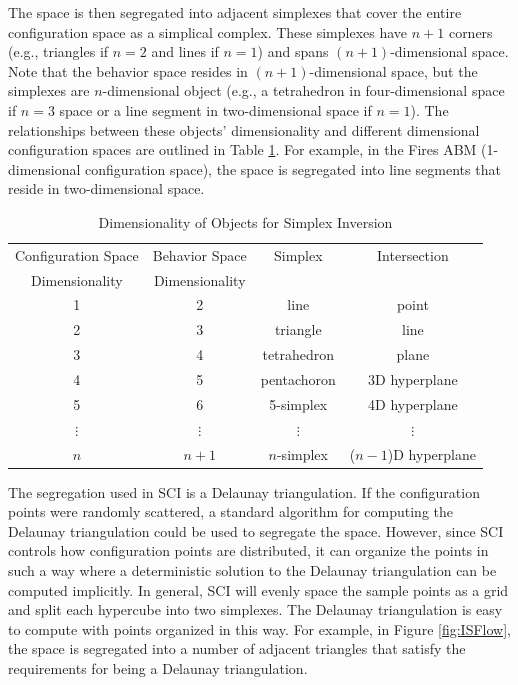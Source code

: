 The space is then segregated into adjacent simplexes that cover the entire configuration space as a simplical complex.
These simplexes have $n + 1$ corners (e.g., triangles if $n=2$ and lines if $n=1$) and spans $(n+1)$-dimensional space.
Note that the behavior space resides in $(n+1)$-dimensional space, but the simplexes are $n$-dimensional object (e.g., a tetrahedron in four-dimensional space if $n=3$ space or a line segment in two-dimensional space if $n=1$).
The relationships between these objects' dimensionality and different dimensional configuration spaces are outlined in Table \ref{table:dims}.
For example, in the Fires ABM (1-dimensional configuration space), the space is segregated into line segments that reside in two-dimensional space.

\begin{table}[ht]
  \caption{Dimensionality of Objects for Simplex Inversion}
  \centering
  \begin{tabular}{c c c c}
    \hline \hline
    Configuration Space & Behavior Space & Simplex & Intersection \\
    Dimensionality      & Dimensionality &         &  \\
    \hline
    1 & 2 & line & point \\
    2 & 3 & triangle & line \\
    3 & 4 & tetrahedron & plane \\
    4 & 5 & pentachoron & 3D hyperplane \\
    5 & 6 & 5-simplex & 4D hyperplane \\
    $\vdots$ & $\vdots$ & $\vdots$ & $\vdots$ \\
    $n$ & $n + 1$ & $n$-simplex & ($n-1$)D hyperplane \\
    \hline
  \end{tabular}
  \label{table:dims}
\end{table}

The segregation used in SCI is a Delaunay triangulation.
If the configuration points were randomly scattered, a standard algorithm for computing the Delaunay triangulation could be used to segregate the space.
However, since SCI controls how configuration points are distributed, it can organize the points in such a way where a deterministic solution to the Delaunay triangulation can be computed implicitly.
In general, SCI will evenly space the sample points as a grid and split each hypercube into two simplexes.
The Delaunay triangulation is easy to compute with points organized in this way.
For example, in Figure \ref{fig:ISFlow}, the space is segregated into a number of adjacent triangles that satisfy the requirements for being a Delaunay triangulation.

